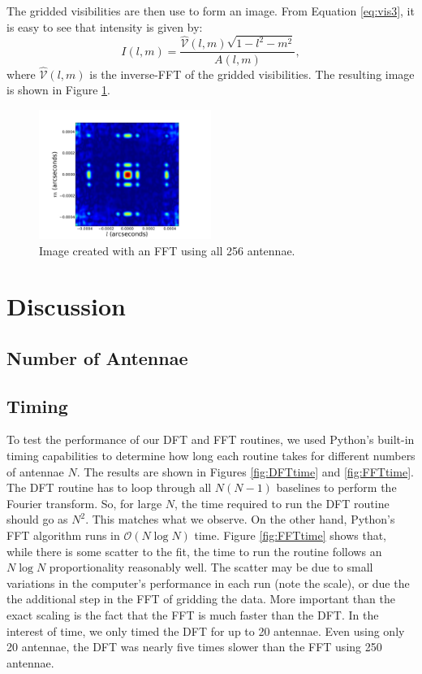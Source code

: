 \documentclass[11pt,letterpaper]{article}
\begin{document}
The gridded visibilities are then use to form an image.  From Equation 
\ref{eq:vis3}, it is easy to see that intensity is given by:
\begin{equation}
I(l,m)=\frac{\hat{\mathcal{V}}(l,m)\sqrt{1-l^2-m^2}}{A(l,m)},
\end{equation}
where $\hat{\mathcal{V}}(l,m)$ is the inverse-FFT of the gridded 
visibilities.  The resulting image is shown in Figure \ref{fig:fft}.

\begin{figure}[!h]
\centering
\includegraphics[width=0.5\textwidth]{FFT_Image.pdf}
\caption{Image created with an FFT using all 256 antennae.}
\label{fig:fft}
\end{figure}


\section{Discussion}
\subsection{Number of Antennae}

\subsection{Timing}
To test the performance of our DFT and FFT routines, we used Python's built-in 
timing capabilities to determine how long each routine takes for different 
numbers of antennae $N$.  The results are shown in Figures \ref{fig:DFTtime} and 
\ref{fig:FFTtime}.  The DFT routine has to loop through all $N(N-1)$ baselines 
to perform the Fourier transform.  So, for large $N$, the time required to 
run the DFT routine should go as $N^2$.  This matches what we observe.  On the 
other hand, Python's FFT algorithm runs in $\mathcal{O}(N\log N)$ time.  Figure 
\ref{fig:FFTtime} shows that, while there is some scatter to the fit, the time 
to run the routine follows an $N\log N$ proportionality reasonably well.  
The scatter may be due to small variations in the computer's performance in 
each run (note the scale), or due the the additional step in the FFT of 
gridding the data.  More important than the exact scaling is the fact that 
the FFT is much faster than the DFT.  In the interest of time, we only timed 
the DFT for up to 20 antennae.  Even using only 20 antennae, the DFT was nearly 
five times slower than the FFT using 250 antennae.
\end{document}

